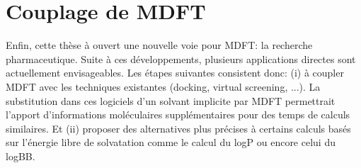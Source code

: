 \section{Couplage de MDFT}
Enfin, cette thèse à ouvert une nouvelle voie pour MDFT: la recherche pharmaceutique. Suite à ces développements, plusieurs applications directes sont actuellement envisageables. Les étapes suivantes consistent donc: (i) à coupler MDFT avec les techniques existantes (docking, virtual screening, ...). La substitution dans ces logiciels d'un solvant implicite par MDFT permettrait l'apport d'informations moléculaires supplémentaires pour des temps de calculs similaires. Et (ii) proposer des alternatives plus précises à certains calculs basés sur l'énergie libre de solvatation comme le calcul du logP ou encore celui du logBB.









